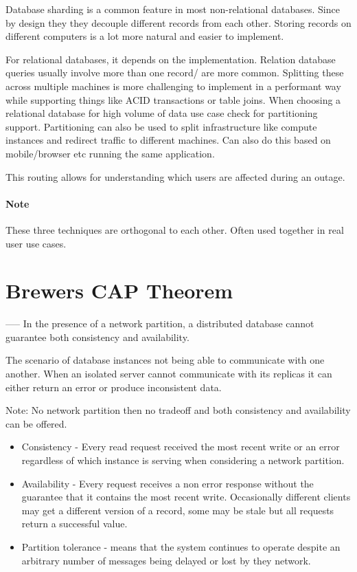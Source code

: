 \documentclass[a4paper, 11pt]{book}
\begin{document}
    Database sharding is a common feature in most non-relational databases.
    Since by design they they decouple different records from each other.
    Storing records on different computers is a lot more natural and easier to implement.

    For relational databases, it depends on the implementation.
    Relation database queries usually involve more than one record/ are more common.
    Splitting these across multiple machines is more challenging to implement in a performant way while supporting things like ACID transactions or table joins.
    When choosing a relational database for high volume of data use case check for partitioning support.
    Partitioning can also be used to split infrastructure like compute instances and redirect traffic to different machines.
    Can also do this based on mobile/browser etc running the same application.

    This routing allows for understanding which users are affected during an outage.

    \paragraph{Note}
    These three techniques are orthogonal to each other. Often used together in real user use cases.


    \section{Brewers CAP Theorem}

    ----- In the presence of a network partition, a distributed database cannot guarantee both consistency and availability.

    The scenario of database instances not being able to communicate with one another.
    When an isolated server cannot communicate with its replicas it can either return an error or produce inconsistent data.

    Note: No network partition then no tradeoff and both consistency and availability can be offered.

    \begin{itemize}
        \item Consistency - Every read request received the most recent write or an error regardless of which instance is serving when considering a network partition.
        \item Availability - Every request receives a non error response without the guarantee that it contains the most recent write.
        Occasionally different clients may get a different version of a record, some may be stale but all requests return a successful value.
        \item Partition tolerance - means that the system continues to operate despite an arbitrary number of messages being delayed or lost by they network.
    \end{itemize}
\end{document}
